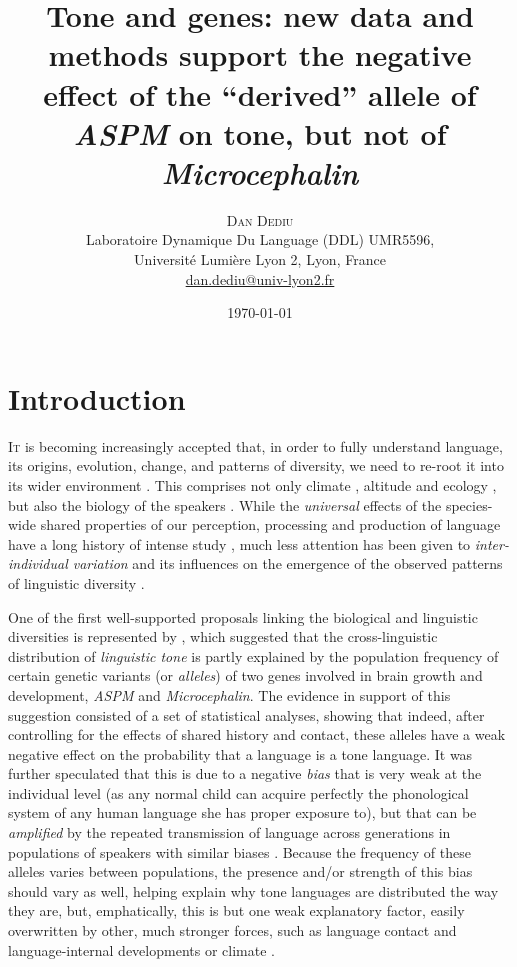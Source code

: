 \documentclass[twoside,onecolumn]{article}
\title{Tone and genes: new data and methods support the negative effect of the ``derived'' allele of \textit{ASPM} on tone, but not of \textit{Microcephalin}} %
\author{%
\textsc{Dan Dediu} \\[1ex] %
\normalsize Laboratoire Dynamique Du Language (DDL) UMR5596,\\
\normalsize Université Lumière Lyon 2, Lyon, France \\ %
\normalsize \href{mailto:dan.dediu@univ-lyon2.fr}{dan.dediu@univ-lyon2.fr} %
}
\date{\today} %
\begin{document}
\maketitle


\section{Introduction}

\lettrine[nindent=0em,lines=2]{I} t is becoming increasingly accepted that, in order to fully understand language, its origins, evolution, change, and patterns of diversity, we need to re-root it into its wider environment \citep{dediu_language_2017,blasi_human_2019,everett_language_2016}.
This comprises not only climate \citep{everett_language_2016}, altitude \citep{everett_evidence_2013} and ecology \citep{bentz_evolution_2018}, but also the biology of the speakers \citep{dediu_language_2017}.
While the \emph{universal} effects of the species-wide shared properties of our perception, processing and production of language have a long history of intense study \citep{christiansen_language_2008,ohala_sound_1989,yu_origins_2013}, much less attention has been given to \emph{inter-individual variation} and its influences on the emergence of the observed patterns of linguistic diversity \citep{dediu_language_2017}.

One of the first well-supported proposals linking the biological and linguistic diversities is represented by \citet{dediu_ladd_2007}, which suggested that the cross-linguistic distribution of \emph{linguistic tone} is partly explained by the population frequency of certain genetic variants (or \emph{alleles}) of two genes involved in brain growth and development, \textit{ASPM} and \textit{Microcephalin}.
The evidence in support of this suggestion consisted of a set of statistical analyses, showing that indeed, after controlling for the effects of shared history and contact, these alleles have a weak negative effect on the probability that a language is a tone language.
It was further speculated that this is due to a negative \emph{bias} that is very weak at the individual level (as any normal child can acquire perfectly the phonological system of any human language she has proper exposure to), but that can be \emph{amplified} by the repeated transmission of language across generations in populations of speakers with similar biases \citet{dediu_ladd_2007,ladd_bioling_2008,dediu_humbiol_2011}.
Because the frequency of these alleles varies between populations, the presence and/or strength of this bias should vary as well, helping explain why tone languages are distributed the way they are, but, emphatically, this is but one weak explanatory factor, easily overwritten by other, much stronger forces, such as language contact and language-internal developments \citep{hombert_tone_1979,yip_tone_2002,hombert_towards_1975} or climate \citep{everett_language_2016}.
\end{document}
